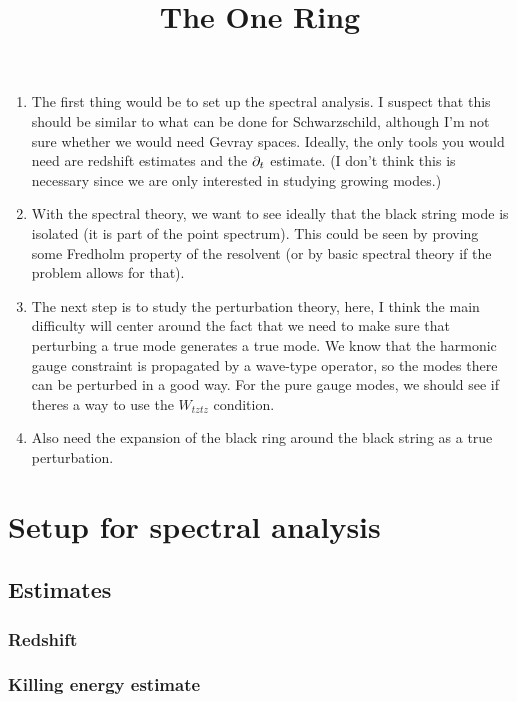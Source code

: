 \documentclass{article}
\title{The One Ring}
\date{}
\begin{document}
\maketitle

\begin{enumerate}
\item The first thing would be to set up the spectral analysis. I
  suspect that this should be similar to what can be done for
  Schwarzschild, although I'm not sure whether we would need Gevray
  spaces. Ideally, the only tools you would need are redshift
  estimates and the $\partial_t$ estimate. (I don't think this is necessary
  since we are only interested in studying growing modes.)
\item With the spectral theory, we want to see ideally that the black
  string mode is isolated (it is part of the point spectrum). This
  could be seen by proving some Fredholm property of the resolvent (or
  by basic spectral theory if the problem allows for that).
\item The next step is to study the perturbation theory, here, I think
  the main difficulty will center around the fact that we need to make
  sure that perturbing a true mode generates a true mode. We know that
  the harmonic gauge constraint is propagated by a wave-type operator,
  so the modes there can be perturbed in a good way. For the pure
  gauge modes, we should see if theres a way to use the $W_{tztz}$
  condition.
\item Also need the expansion of the black ring around the black
  string as a true perturbation.
\end{enumerate}

\section{Setup for spectral analysis}

\subsection{Estimates}

\subsubsection{Redshift}

\subsubsection{Killing energy estimate}
\end{document}
